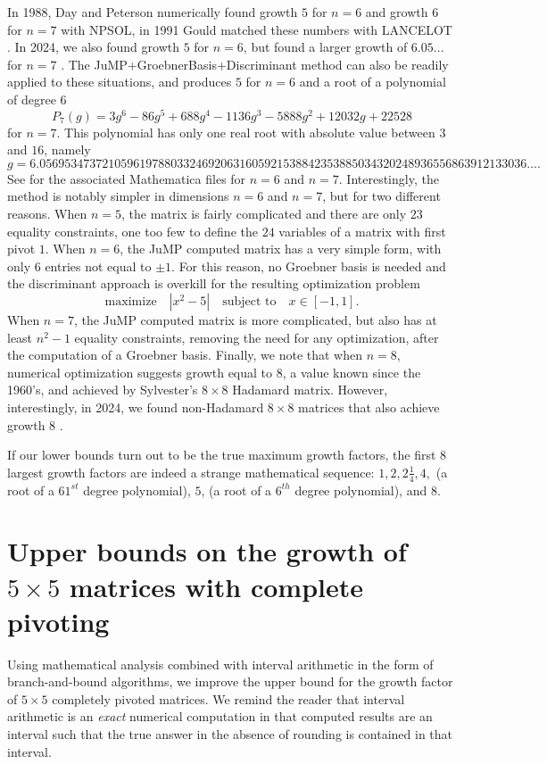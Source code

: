 \documentclass[reqno]{amsart}
\numberwithin{equation}{section}
\begin{document}
In 1988, Day and Peterson numerically found growth $5$ for $n = 6$ and growth $6$ for $n = 7$ \cite{day1988growth} with NPSOL, in 1991 Gould matched these numbers with LANCELOT \cite{gould1991growth}. In 2024, we also found growth $5$ for $n = 6$, but found a larger growth of $6.05\dots$ for $n =7$ \cite{edelman2024some}. The JuMP+GroebnerBasis+Discriminant method can also be readily applied to these situations, and produces $5$ for $n = 6$ and a root of a polynomial of degree $6$
$$P_7(g)=3g^6 - 86g^5 + 688g^4 - 1136g^3 - 5888g^2 + 12032g + 22528$$
for $n = 7$. This polynomial has only one real root with absolute value between $3$ and $16$, namely
$$g =6.056953473721059619788033246920631605921538842353885034320248936556863912133036\dots.$$
See \cite{githubrepo} for the associated Mathematica files for $n = 6$ and $n = 7$. Interestingly, the method is notably simpler in dimensions $n =6$ and $n = 7$, but for two different reasons. When $n =5$, the matrix is fairly complicated and there are only $23$ equality constraints, one too few to define the $24$ variables of a matrix with first pivot $1$. When $n = 6$, the JuMP computed matrix has a very simple form, with only $6$ entries not equal to $\pm 1$. For this reason, no Groebner basis is needed and the discriminant approach is overkill for the resulting optimization problem 
$$\mathrm{maximize} \quad |x^2 - 5| \quad \text{subject to} \quad x \in [-1,1].$$
When $n = 7$, the JuMP computed matrix is more complicated, but also has at least $n^2-1$ equality constraints, removing the need for any optimization, after the computation of a Groebner basis. Finally, we note that when $n = 8$, numerical optimization suggests growth equal to $8$, a value known since the 1960's, and achieved by Sylvester's $8 \times 8$ Hadamard matrix. However, interestingly, in 2024, we found non-Hadamard $8\times 8$ matrices that also achieve growth $8$ \cite[Table 1]{edelman2024some}.

If our lower bounds turn out to be the true
maximum growth factors, the first $8$ largest growth factors are indeed
a strange mathematical sequence: $1,2,2 \frac{1}{4},4,$
(a root of a $61^{st}$ degree polynomial), $5$, (a root of a $6^{th}$ degree polynomial), and $8$.  


\section{Upper bounds on the growth of $5 \times 5$ matrices with complete pivoting}

Using mathematical analysis combined with interval arithmetic in the form of branch-and-bound algorithms, we improve the upper bound for the growth factor of $5 \times 5$ completely pivoted matrices. We remind the reader that interval arithmetic is an \textit{exact} numerical computation in that computed results are an interval such that the true answer in the absence of rounding is contained in that interval.
\end{document}
